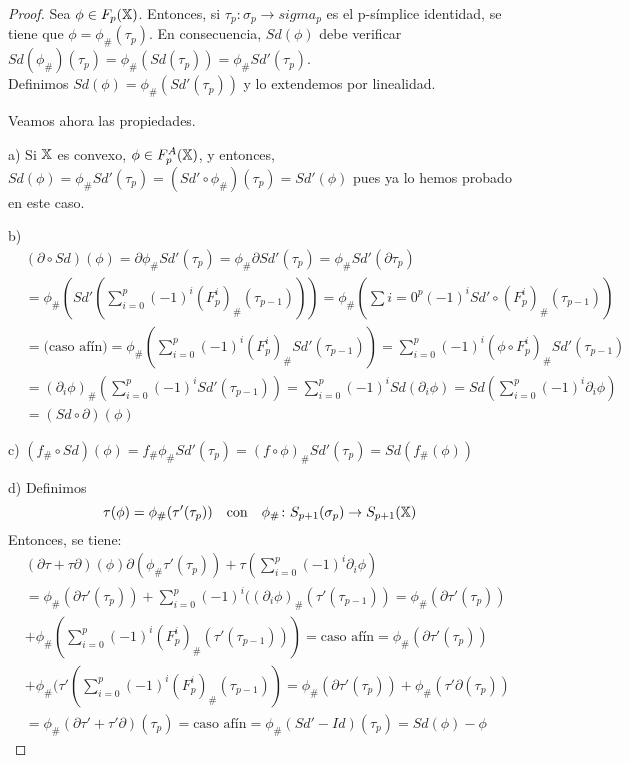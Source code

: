\begin{proof}
  Sea $\phi \in F_p({\mathbb X})$. Entonces, si $\tau_p \colon \sigma_p \to sigma_p$ es el p-símplice identidad, se tiene que
  $\phi = \phi_\#(\tau_p)$. En consecuencia, $Sd(\phi)$ debe verificar $Sd(\phi_\#)(\tau_p) = \phi_\#(Sd(\tau_p)) = \phi_\# Sd'(\tau_p)$. \\
  Definimos $Sd(\phi) = \phi_\#(Sd'(\tau_p))$ y lo extendemos por linealidad.

  Veamos ahora las propiedades.

  a) Si ${\mathbb X}$ es convexo, $\phi \in F_p^A({\mathbb X})$, y entonces, $Sd(\phi) = \phi_\# Sd'(\tau_p) = (Sd' \circ \phi_\#)(\tau_p) = Sd'(\phi)$
  pues ya lo hemos probado en este caso.

  b) \begin{align*}
    &(\partial \circ Sd)(\phi) = \partial \phi_\# Sd'(\tau_p) = \phi_\# \partial Sd'(\tau_p) = \phi_\# Sd'(\partial \tau_p) \\
    &= \phi_\#(Sd'(\sum\limits_{i = 0}^p (-1)^i (F_p^i)_\# (\tau_{p-1}))) = \phi_\#(\sum\limits{i = 0}^p (-1)^i Sd' \circ (F_p^i)_\#(\tau_{p-1}))\\
    &= \text{(caso afín)} = \phi_\#(\sum\limits_{i = 0}^p (-1)^i (F_p^i)_\# Sd'(\tau_{p-1})) = \sum\limits_{i = 0}^p (-1)^i (\phi \circ F_p^i)_\# Sd'(\tau_{p-1}) \\
    &= (\partial_i \phi)_\# (\sum\limits_{i = 0}^p (-1)^i Sd'(\tau_{p-1})) = \sum\limits_{i = 0}^p (-1)^i Sd(\partial_i \phi) = Sd(\sum\limits_{i = 0}^p (-1)^i \partial_i \phi) \\
    &= (Sd \circ \partial)(\phi)
  \end{align*}

  c) $(f_\# \circ Sd)(\phi) = f_\# \phi_\# Sd'(\tau_p) = (f \circ \phi)_\# Sd'(\tau_p) = Sd(f_\#(\phi))$

  d) Definimos \[\tau(\phi) = \phi_\#(\tau'(\tau_p)) \quad \text{con} \quad \phi_\# \colon S_{p+1}(\sigma_p) \to S_{p+1}({\mathbb X}) \]
  Entonces, se tiene:
  \begin{align*}
    &(\partial \tau + \tau \partial)(\phi) \partial(\phi_\# \tau'(\tau_p)) + \tau(\sum\limits_{i = 0}^p (-1)^i \partial_i \phi) \\
    &= \phi_\#(\partial \tau'(\tau_p)) + \sum\limits_{i = 0}^p (-1)^i((\partial_i \phi)_\#(\tau'(\tau_{p-1})) = \phi_\#(\partial \tau'(\tau_p)) \\
    &+ \phi_\#(\sum\limits_{i = 0}^p (-1)^i (F_p^i)_\# (\tau'(\tau_{p-1}))) = \text{caso afín} = \phi_\#(\partial \tau'(\tau_p)) \\
    &+ \phi_\#(\tau'(\sum\limits_{i = 0}^p (-1)^i (F_p^i)_\#(\tau_{p-1})) = \phi_\#(\partial \tau'(\tau_p)) + \phi_\#(\tau'\partial(\tau_p)) \\
    &= \phi_\#(\partial \tau' + \tau' \partial)(\tau_p) = \text{caso afín} = \phi_\#(Sd' - Id)(\tau_p) = Sd(\phi) - \phi
  \end{align*}


\end{proof}
